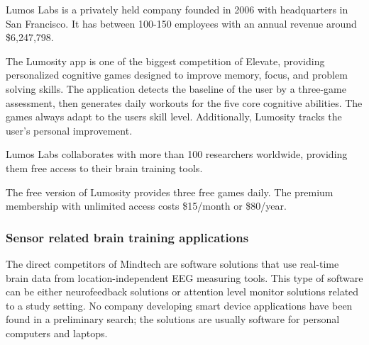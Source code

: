 \documentclass[letterpaper,10pt]{article}
\begin{document}

Lumos Labs is a privately held company founded in 2006 with headquarters in San Francisco. It has between 100-150 employees with an annual revenue around \$6,247,798. \cite{mergent_intellect}

\cite{mergent_intellect}

The Lumosity app is one of the biggest competition of Elevate, providing personalized cognitive games designed to improve memory, focus, and problem solving skills. The application detects the baseline of the user by a three-game assessment, then generates daily workouts for the five core cognitive abilities. The games always adapt to the users skill level. Additionally, Lumosity tracks the user’s personal improvement. 

Lumos Labs collaborates with more than 100 researchers worldwide, providing them free access to their brain training tools. 

The free version of Lumosity provides three free games daily. The premium membership with unlimited access costs \$15/month or \$80/year.

\cite{lumosity}

\subsubsection{Sensor related brain training applications}

The direct competitors of Mindtech are software solutions that use real-time brain data from location-independent EEG measuring tools. This type of software can be either neurofeedback solutions or attention level monitor solutions related to a study setting. No company developing smart device applications have been found in a preliminary search; the solutions are usually software for personal computers and laptops.
\end{document}
